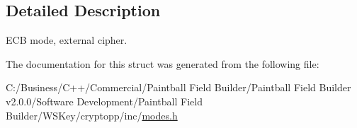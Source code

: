 \subsection{Detailed Description}
ECB mode, external cipher. 

The documentation for this struct was generated from the following file:\begin{DoxyCompactItemize}
\item 
C:/Business/C++/Commercial/Paintball Field Builder/Paintball Field Builder v2.0.0/Software Development/Paintball Field Builder/WSKey/cryptopp/inc/\hyperlink{modes_8h}{modes.h}\end{DoxyCompactItemize}
